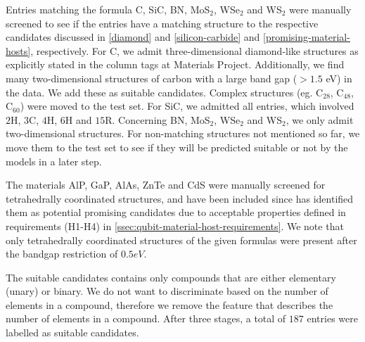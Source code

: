 


Entries matching the formula C, SiC, BN, MoS$_2$, WSe$_2$ and WS$_2$ were manually screened to see if the entries have a matching structure to the respective candidates discussed in \autoref{diamond} and \ref{silicon-carbide} and \ref{promising-material-hosts}, respectively.
For C, we admit three-dimensional diamond-like structures as explicitly stated in the column tags at Materials Project. Additionally, we find many two-dimensional structures of carbon with a large band gap ($>1.5$ eV) in the data. We add these as suitable candidates. Complex structures (eg. C$_{28}$, C$_{48}$, C$_{60}$) were moved to the test set. For SiC, we admitted all entries, which involved $2$H, $3$C, $4$H, $6$H and $15$R. Concerning BN, MoS$_2$, WSe$_2$ and  WS$_2$, we only admit two-dimensional structures. For non-matching structures not mentioned so far, we move them to the test set to see if they will be predicted suitable or not by the models in a later step.



The materials AlP, GaP, AlAs, ZnTe and CdS were manually screened for tetrahedrally coordinated structures, and have been included since \citeauthor{Weber2010} \cite{Weber2010} has identified them as potential promising candidates due to acceptable properties defined in requirements (H1-H4) in \autoref{ssec:qubit-material-host-requirements}. We note that only tetrahedrally coordinated structures of the given formulas were present after the bandgap restriction of $0.5eV$.

The suitable candidates contains only compounds that are either elementary (unary) or binary. We do not want to discriminate based on the number of elements in a compound, therefore we remove the feature that describes the number of elements in a compound. After three stages, a total of $187$ entries were labelled as suitable candidates.

